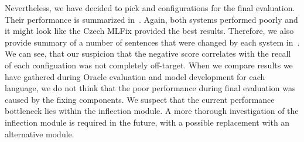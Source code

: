 \begin{table}[t]
\centering
\small
{}
\caption[Automatic evaluation of the German error detection module]{
    Automatic evaluation of the error detection module using different voting methods to interpret output
of mutliple models using BLEU metric. Values are multiplied by 100 for easier reading,
and the relative improvement over the baseline MT output.
Performance of the
Oracle classifier is provided for comparison.
The best model for each dataset is printed in bold.
}
\label{markonly_de-summary}
\end{table}

Nevertheless, we have decided to pick  and  configurations
for the final evaluation. Their performance is summarized in~. Again, both
systems performed poorly and it might look like the Czech MLFix provided the best results. Therefore,
we also provide summary of a number of sentences that were changed by each system in~.
We can see, that our suspicion that the negative score correlates with the recall of each configuation was not
completely off-target. When we compare results we have gathered during Oracle evaluation and model
development for each language, we do not think that the poor performance during final evaluation was caused by the fixing
components. We suspect that the current performance bottleneck lies within the inflection module.
A more thorough investigation of the inflection module is required in the future, with a possible
replacement with an alternative module.

